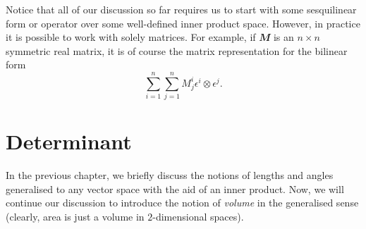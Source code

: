 \documentclass[math]{amznotes}
\theoremstyle{remark}
\begin{document}
    Notice that all of our discussion so far requires us to start with some sesquilinear form or operator over some well-defined inner product space. However, in practice it is possible to work with solely matrices. For example, if $\mathbfit{M}$ is an $n \times n$ symmetric real matrix, it is of course the matrix representation for the bilinear form 
    \begin{equation*}
        \sum_{i = 1}^{n}\sum_{j = 1}^{n}M^i_j\epsilon^i \otimes \epsilon^j.
    \end{equation*}
\chapter{Determinant}
In the previous chapter, we briefly discuss the notions of lengths and angles generalised to any vector space with the aid of an inner product. Now, we will continue our discussion to introduce the notion of \textit{volume} in the generalised sense (clearly, area is just a volume in $2$-dimensional spaces).
\end{document}
